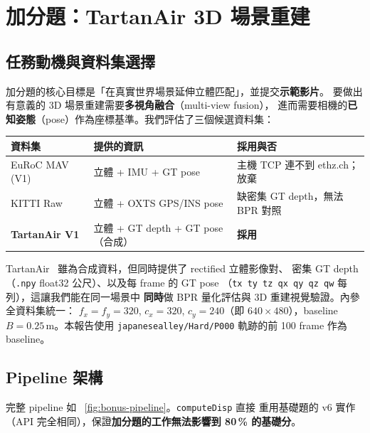 \documentclass[11pt,a4paper]{article}
\begin{document}
\section{加分題：TartanAir 3D 場景重建}
\label{sec:bonus}

\subsection{任務動機與資料集選擇}
\label{sec:bonus-dataset}
加分題的核心目標是「在真實世界場景延伸立體匹配」，並提交\textbf{示範影片}。
要做出有意義的 3D 場景重建需要\textbf{多視角融合}（multi-view fusion），
進而需要相機的\textbf{已知姿態}（pose）作為座標基準。我們評估了三個候選資料集：

\begin{table}[H]\centering
\begin{tabular}{lll}
  \toprule
  資料集 & 提供的資訊 & 採用與否 \\
  \midrule
  EuRoC MAV (V1) & 立體 + IMU + GT pose & 主機 TCP 連不到 ethz.ch；放棄 \\
  KITTI Raw      & 立體 + OXTS GPS/INS pose & 缺密集 GT depth，無法 BPR 對照 \\
  \textbf{TartanAir V1} & 立體 + GT depth + GT pose（合成） & \textbf{採用} \\
  \bottomrule
\end{tabular}
\end{table}

\noindent TartanAir~\cite{Wang2020} 雖為合成資料，但同時提供了 rectified 立體影像對、
密集 GT depth（\texttt{.npy} float32 公尺）、以及每 frame 的 GT pose
（\texttt{tx ty tz qx qy qz qw} 每列），這讓我們能在同一場景中
\textbf{同時}做 BPR 量化評估與 3D 重建視覺驗證。內參全資料集統一：
$f_x=f_y=320$, $c_x=320$, $c_y=240$（即 $640\!\times\!480$），baseline
$B=0.25\,\mathrm{m}$。本報告使用 \texttt{japanesealley/Hard/P000} 軌跡的前
100 frame 作為 baseline。

\subsection{Pipeline 架構}
完整 pipeline 如 \figurename~\ref{fig:bonus-pipeline}。\texttt{computeDisp} 直接
重用基礎題的 v6 實作（API 完全相同），保證\textbf{加分題的工作無法影響到 80\,\% 的基礎分}。
\end{document}
